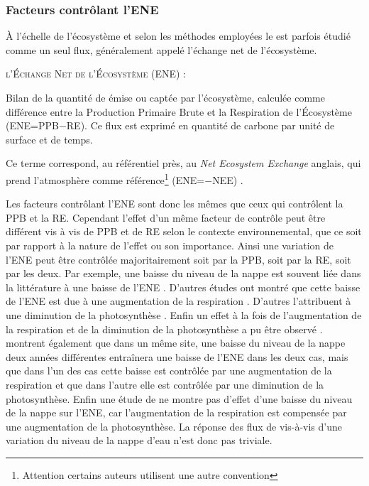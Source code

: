 \subsubsection{Facteurs contrôlant l'ENE}

À l'échelle de l'écosystème et selon les méthodes employées le \coo est parfois étudié comme un seul flux, généralement appelé l'échange net de l'écosystème.

\begin{pdef}
\textsc{l'Échange Net de l'Écosystème (ENE)} :

Bilan de la quantité de \coo émise ou captée par l'écosystème, calculée comme  différence entre la Production Primaire Brute et la Respiration de l'Écosystème (ENE=PPB$-$RE).
Ce flux est exprimé en quantité de carbone par unité de surface et de temps.
\end{pdef}
Ce terme correspond, au référentiel près, au \textit{Net Ecosystem Exchange} anglais, qui prend l'atmosphère comme référence\footnote{Attention certains auteurs utilisent une autre convention} (ENE=$-$NEE) \citep{chapin2006}.

Les facteurs contrôlant l'ENE sont donc les mêmes que ceux qui contrôlent la PPB et la RE.
Cependant l'effet d'un même facteur de contrôle peut être différent vis à vis de PPB et de RE selon le contexte environnemental, que ce soit par rapport à la nature de l'effet ou son importance.
Ainsi une variation de l'ENE peut être contrôlée majoritairement soit par la PPB, soit par la RE, soit par les deux.
Par exemple, une baisse du niveau de la nappe est souvent liée dans la littérature à une baisse de l'ENE \plop.
D'autres études ont montré que cette baisse de l'ENE est due à une augmentation de la respiration \citep{alm1999, ise2008}.
D'autres l'attribuent à une diminution de la photosynthèse \citep{sonnentag2010,peichl2014}.
Enfin un effet à la fois de l'augmentation de la respiration et de la diminution de la photosynthèse a pu être observé \citep{strack2013}.
\citet{lund2012} montrent également que dans un même site, une baisse du niveau de la nappe deux années différentes entraînera une baisse de l'ENE dans les deux cas, mais que dans l'un des cas cette baisse est contrôlée par une augmentation de la respiration et que dans l'autre elle est contrôlée par une diminution de la photosynthèse.
Enfin une étude de \citet{ballantyne2014} ne montre pas d'effet d'une baisse du niveau de la nappe sur l'ENE, car l'augmentation de la respiration est compensée par une augmentation de la photosynthèse.
La réponse des flux de \coo vis-à-vis d'une variation du niveau de la nappe d'eau n'est donc pas triviale.

